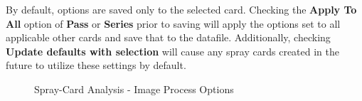 \documentclass[10pt,letterpaper,titlepage]{article}
\begin{document}
    By default, options are saved only to the selected card. Checking the \textbf{Apply To All} option of \textbf{Pass} or \textbf{Series} prior to saving will apply the options set to all applicable other cards and save that to the datafile. Additionally, checking \textbf{Update defaults with selection} will cause any spray cards created in the future to utilize these settings by default.
    
    \begin{figure}[hb]
        \centering
        \caption{Spray-Card Analysis - Image Process Options}
        \label{fig:card_image_process}
    \end{figure}
    \FloatBarrier
\end{document}

